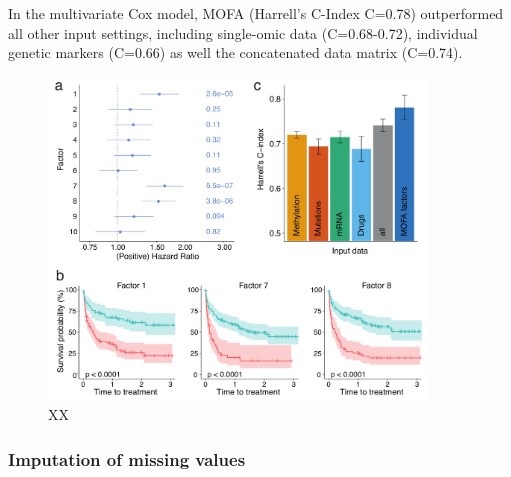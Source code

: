 In the multivariate Cox model, MOFA (Harrell's C-Index C=0.78) outperformed all other input settings, including single-omic data (C=0.68-0.72), individual genetic markers (C=0.66) as well the concatenated data matrix (C=0.74).


\begin{figure}[H]
	\centering 	
	\includegraphics[width=0.9\textwidth]{MOFA_CLL_Cox}
	\caption{XX}
	\label{fig:MOFA_CLL_Cox}
\end{figure}


\subsubsection{Imputation of missing values}

